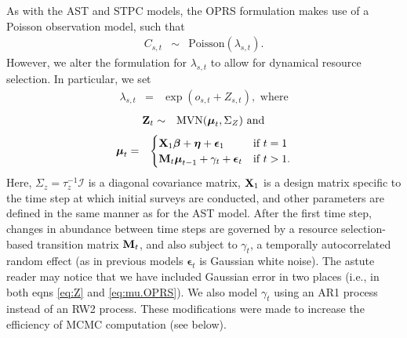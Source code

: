 \documentclass[12pt,fleqn]{article}
\begin{document}
\begin{flushleft}
As with the AST and STPC models, the OPRS formulation makes use of a Poisson observation model, such that
\begin{eqnarray*}
  C_{s,t} & \sim & \textrm{Poisson}(\lambda_{s,t}).
\end{eqnarray*}
However, we alter the formulation for $\lambda_{s,t}$ to allow for dynamical resource selection.  In
particular, we set
\begin{eqnarray*}
  \lambda_{s,t} & = & \exp(o_{s,t} + Z_{s,t}), \textrm{ where}
\end{eqnarray*}
\begin{eqnarray}
  {\bf Z}_t & \sim & \textrm{MVN}(\boldsymbol{\mu}_t,\Sigma_Z) \textrm{ and}
  \label{eq:Z}
\end{eqnarray}
\begin{eqnarray}
  \boldsymbol{\mu}_t & = &  \begin{cases}
                    {\bf X}_1 \boldsymbol{\beta} + \boldsymbol{\eta} + \boldsymbol{\epsilon}_1 & \text{if }t=1 \\
                     {\bf M}_t \boldsymbol{\mu}_{t-1} + \gamma_t + \boldsymbol{\epsilon}_t & \text{if }t>1.
                  \end{cases}
  \label{eq:mu.OPRS}
\end{eqnarray}
Here, $\Sigma_z = \tau_z^{-1} \mathcal{I}$ is a diagonal covariance matrix, ${\bf X}_{1}$ is a design matrix specific to the time step at which initial surveys are conducted, and other parameters are defined in the same manner as for the AST model. After the first time step, changes in abundance between time steps are governed by a resource selection-based transition matrix ${\bf M}_t$, and also subject to $\gamma_t$, a temporally autocorrelated random effect (as in previous models $\boldsymbol{\epsilon}_t$ is Gaussian white noise).
The astute reader may notice that we have included Gaussian error in two places (i.e., in both eqns \ref{eq:Z} and \ref{eq:mu.OPRS}).  We also model $\gamma_t$ using an AR1 process instead of an RW2 process. These modifications were made to increase the efficiency of MCMC computation (see below).


\end{flushleft}
\end{document}
